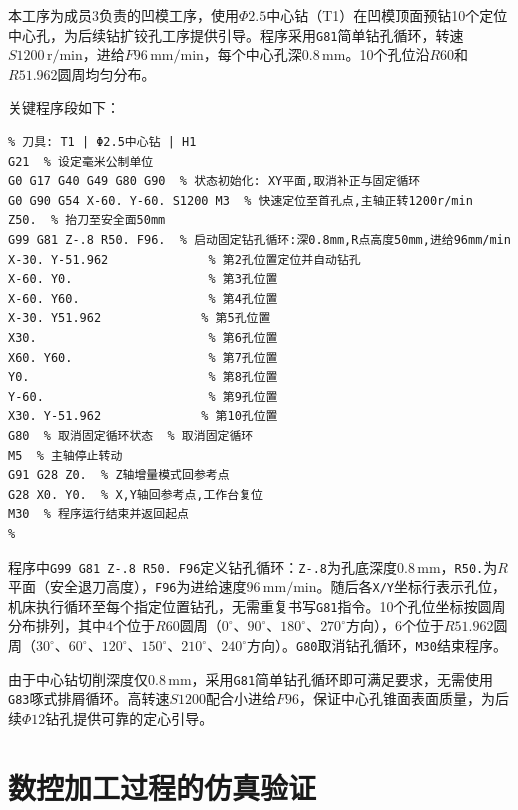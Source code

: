 \documentclass{xautCADreport}
\begin{document}
本工序为成员3负责的凹模工序，使用$\Phi2.5$中心钻（T1）在凹模顶面预钻10个定位中心孔，为后续钻扩铰孔工序提供引导。程序采用\texttt{G81}简单钻孔循环，转速$S1200\,\mathrm{r/min}$，进给$F96\,\mathrm{mm/min}$，每个中心孔深$0.8\,\mathrm{mm}$。10个孔位沿$R60$和$R51.962$圆周均匀分布。

关键程序段如下：

\begin{lstlisting}[caption={工序70凹模孔位预定位程序}]
% 程序名: 工序70-凹模 (孔位预定位)
% 刀具: T1 | Φ2.5中心钻 | H1
G21  % 设定毫米公制单位
G0 G17 G40 G49 G80 G90  % 状态初始化: XY平面,取消补正与固定循环
G0 G90 G54 X-60. Y-60. S1200 M3  % 快速定位至首孔点,主轴正转1200r/min
Z50.  % 抬刀至安全面50mm
G99 G81 Z-.8 R50. F96.  % 启动固定钻孔循环:深0.8mm,R点高度50mm,进给96mm/min
X-30. Y-51.962              % 第2孔位置定位并自动钻孔
X-60. Y0.                   % 第3孔位置
X-60. Y60.                  % 第4孔位置
X-30. Y51.962              % 第5孔位置
X30.                        % 第6孔位置
X60. Y60.                   % 第7孔位置
Y0.                         % 第8孔位置
Y-60.                       % 第9孔位置
X30. Y-51.962              % 第10孔位置
G80  % 取消固定循环状态  % 取消固定循环
M5  % 主轴停止转动
G91 G28 Z0.  % Z轴增量模式回参考点
G28 X0. Y0.  % X,Y轴回参考点,工作台复位
M30  % 程序运行结束并返回起点
%
\end{lstlisting}

程序中\texttt{G99 G81 Z-.8 R50. F96}定义钻孔循环：\texttt{Z-.8}为孔底深度$0.8\,\mathrm{mm}$，\texttt{R50.}为$R$平面（安全退刀高度），\texttt{F96}为进给速度$96\,\mathrm{mm/min}$。随后各\texttt{X/Y}坐标行表示孔位，机床执行循环至每个指定位置钻孔，无需重复书写\texttt{G81}指令。10个孔位坐标按圆周分布排列，其中4个位于$R60$圆周（$0^\circ$、$90^\circ$、$180^\circ$、$270^\circ$方向），6个位于$R51.962$圆周（$30^\circ$、$60^\circ$、$120^\circ$、$150^\circ$、$210^\circ$、$240^\circ$方向）。\texttt{G80}取消钻孔循环，\texttt{M30}结束程序。

由于中心钻切削深度仅$0.8\,\mathrm{mm}$，采用\texttt{G81}简单钻孔循环即可满足要求，无需使用\texttt{G83}啄式排屑循环。高转速$S1200$配合小进给$F96$，保证中心孔锥面表面质量，为后续$\Phi12$钻孔提供可靠的定心引导。


\newpage

\section{数控加工过程的仿真验证}
\end{document}

